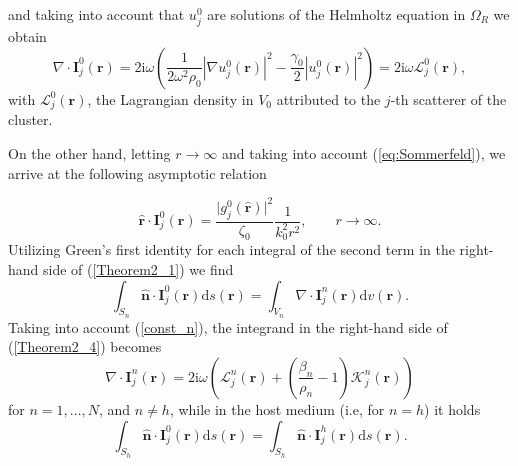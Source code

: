 \documentclass{article}
\begin{document}
%
and taking into account that $u_j^0$ are solutions of the Helmholtz equation in $\Omega_R$ we obtain
%
\begin{equation}\label{Theorem2_2}
    \nabla\cdot\mathbf{I}_j^0(\mathbf{r})=2\mathrm{i}\omega\left(\frac{1}{2\omega^2\rho_0}\left|\nabla u_j^0(\mathbf{r})\right|^2-\frac{\gamma_0}{2}\left|u_j^0(\mathbf{r})\right|^2\right)=2\mathrm{i}\omega\mathcal{L}_j^0(\mathbf{r}),
\end{equation}
%
with $\mathcal{L}_j^0(\mathbf{r})$, the Lagrangian density in $V_0$ attributed to the $j$-th scatterer of the cluster.

On the other hand, letting $r\rightarrow\infty$ and taking into account (\ref{eq:Sommerfeld}), we arrive at the following asymptotic relation
%

\begin{equation}\label{Theorem2_3}
    \hat{\mathbf{r}}\cdot\mathbf{I}_j^0(\mathbf{r})=\frac{\lvert g_j^0(\hat{\mathbf{r}})\rvert^2}{\zeta_0}\frac{1}{k_0^2r^2}, \qquad r\rightarrow\infty.
\end{equation}
%
Utilizing Green's first identity for each integral of the second term in the right-hand side of (\ref{Theorem2_1}) we find
%
\begin{equation}
    \label{Theorem2_4}
    \int_{S_n}\hat{\mathbf{n}}\cdot\mathbf{I}_j^0(\mathbf{r})\mathrm{d}s(\mathbf{r})=\int_{V_n}\nabla\cdot\mathbf{I}_j^n(\mathbf{r})\mathrm{d}v(\mathbf{r}).
\end{equation}
%
Taking into account (\ref{const_n}), the integrand in the right-hand side of (\ref{Theorem2_4}) becomes
%
\begin{equation}
    \label{Theorem2_5}
    \nabla\cdot\mathbf{I}_j^n(\mathbf{r})=2\mathrm{i}\omega\left(\mathcal{L}_j^n(\mathbf{r})+\left(\frac{\beta_n}{\rho_n}-1\right)\mathcal{K}_j^n(\mathbf{r})\right)
\end{equation}
%
for $n=1,\ldots,N$, and $n\ne h$, while in the host medium (i.e, for $n=h$) it holds
%
\begin{equation}
    \label{Theorem2_6}
    \int_{S_h}\hat{\mathbf{n}}\cdot\mathbf{I}_j^0(\mathbf{r})\mathrm{d}s(\mathbf{r})=\int_{S_h}\hat{\mathbf{n}}\cdot\mathbf{I}_j^h(\mathbf{r})\mathrm{d}s(\mathbf{r}).
\end{equation}   
%
\end{document}
